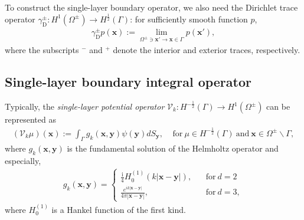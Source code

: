 To construct the single-layer boundary operator, we also need the Dirichlet trace operator 
$\gamma_{\text{D}}^{\pm}: H^{1}(\Omega^{\pm})\rightarrow H^{\frac{1}{2}}(\Gamma)$: for sufficiently smooth function $p$,
\begin{align*}
    \gamma_{\text{D}}^{\pm}p(\boldsymbol{x}):=\lim_{\Omega^{\pm}\ni\boldsymbol{x'}\rightarrow\boldsymbol{x}\in\Gamma}p(\boldsymbol{x'}),
\end{align*}
where the subscripts $^{-}$ and $^{+}$ denote the interior and exterior traces, respectively. 

\subsection{Single-layer boundary integral operator}%
Typically, the \emph{single-layer potential operator} $\mathcal{V}_{k}: H^{-\frac{1}{2}}(\Gamma)\rightarrow H^{1}(\Omega^{\pm})$ can be represented as 
\begin{align*}
    (\mathcal{V}_{k}\mu)(\boldsymbol{x}) := \int_{\Gamma}g_{k}(\boldsymbol{x},\boldsymbol{y})\psi(\boldsymbol{y})dS_{\boldsymbol{y}}, \ \ \ \ \ 
    \text{for}\ \mu\in H^{-\frac{1}{2}}(\Gamma) \  \text{and} \ \boldsymbol{x}\in\Omega^{\pm}\backslash\Gamma,
\end{align*}
where $g_{k}(\boldsymbol{x},\boldsymbol{y})$ is the fundamental solution of the Helmholtz operator and especially,
\begin{align*}
    g_{k}(\boldsymbol{x},\boldsymbol{y}) = \begin{cases}
          \frac{\mathrm{i}}{4}H_{0}^{(1)}(k|\boldsymbol{x}-\boldsymbol{y}|), \ \ \ \ &\text{for} \ d = 2\\
          \frac{e^{ik|\boldsymbol{x}-\boldsymbol{y}|}}{4\pi|\boldsymbol{x} - \boldsymbol{y}|}, \ \ \ \ &\text{for} \ d = 3,
        \end{cases}
\end{align*}
where $H_{0}^{(1)}$ is a Hankel function of the first kind.


